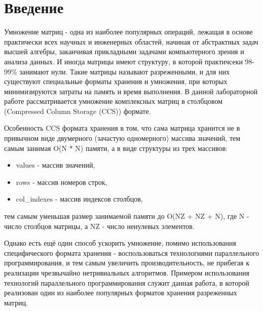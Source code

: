 \documentclass{report}
\begin{document}
	\setcounter{page}{2}


	\tableofcontents
	\newpage


	\section*{Введение}
		\par Умножение матриц - одна из наиболее популярных операций, лежащая в основе практически всех научных и инженерных областей, начиная от абстрактных задач высшей алгебры, заканчивая прикладными задачами компьютерного зрения и анализа данных. И иногда матрицы имеют структуру, в которой практичсеки 98-99\% занимают нули. Такие матрицы называют разреженными, и для них существуют специальные форматы хранения и умножения, при которых минимизируются затраты на память и время выполнения. В данной лабораторной работе рассматривается умножение комплексных матриц в столбцовом (Compressed Column Storage (CCS)) формате.
		\par Особенность CCS формата хранения в том, что сама матрица хранится не в привычном виде двумерного (зачастую одномерного) массива значений, тем самым занимая O(N * N) памяти, а в виде структуры из трех массивов: 
		\begin{itemize}
			\item values - массив значений,
			\item rows - массив номеров строк,
			\item col\_indexes - массив индексов столбцов,
		\end{itemize}
		тем самым уменьшая размер занимаемой памяти до O(NZ + NZ + N), где N - число столбцов матрицы, а NZ - число ненулевых элементов.
		\par Однако есть ещё один способ ускорить умножение, помимо использования специфического формата хранения - воспользоваться технологиями параллельного программирования, и тем самым увеличить производительность, не прибегая к реализации чрезвычайно нетривиальных алгоритмов. Примером использования технологий параллельного программирования служит данная работа, в которой реализован один из наиболее популярных форматов хранения разреженных матриц.
	\newpage


\end{document}
